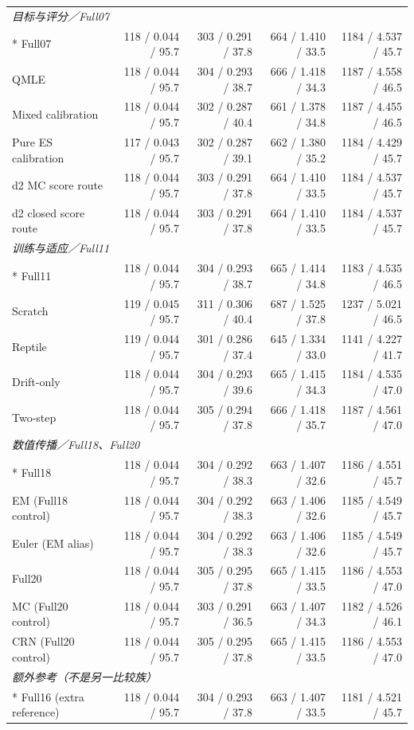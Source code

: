 \begin{longtable}{@{}p{.25\linewidth}rrrr@{}}
\midrule
\multicolumn{5}{l}{\textit{目标与评分／Full07}}\\*
Full07 & 118 / 0.044 / 95.7 & 303 / 0.291 / 37.8 & 664 / 1.410 / 33.5 & 1184 / 4.537 / 45.7\\
QMLE & 118 / 0.044 / 95.7 & 304 / 0.293 / 38.7 & 666 / 1.418 / 34.3 & 1187 / 4.558 / 46.5\\
Mixed calibration & 118 / 0.044 / 95.7 & 302 / 0.287 / 40.4 & 661 / 1.378 / 34.8 & 1187 / 4.455 / 46.5\\
Pure ES calibration & 117 / 0.043 / 95.7 & 302 / 0.287 / 39.1 & 662 / 1.380 / 35.2 & 1184 / 4.429 / 45.7\\
d2 MC score route & 118 / 0.044 / 95.7 & 303 / 0.291 / 37.8 & 664 / 1.410 / 33.5 & 1184 / 4.537 / 45.7\\
d2 closed score route & 118 / 0.044 / 95.7 & 303 / 0.291 / 37.8 & 664 / 1.410 / 33.5 & 1184 / 4.537 / 45.7\\
\midrule
\multicolumn{5}{l}{\textit{训练与适应／Full11}}\\*
Full11 & 118 / 0.044 / 95.7 & 304 / 0.293 / 38.7 & 665 / 1.414 / 34.8 & 1183 / 4.535 / 46.5\\
Scratch & 119 / 0.045 / 95.7 & 311 / 0.306 / 40.4 & 687 / 1.525 / 37.8 & 1237 / 5.021 / 46.5\\
Reptile & 119 / 0.044 / 95.7 & 301 / 0.286 / 37.4 & 645 / 1.334 / 33.0 & 1141 / 4.227 / 41.7\\
Drift-only & 118 / 0.044 / 95.7 & 304 / 0.293 / 39.6 & 665 / 1.415 / 34.3 & 1184 / 4.535 / 47.0\\
Two-step & 118 / 0.044 / 95.7 & 305 / 0.294 / 37.8 & 666 / 1.418 / 35.7 & 1187 / 4.561 / 47.0\\
\midrule
\multicolumn{5}{l}{\textit{数值传播／Full18、Full20}}\\*
Full18 & 118 / 0.044 / 95.7 & 304 / 0.292 / 38.3 & 663 / 1.407 / 32.6 & 1186 / 4.551 / 45.7\\
EM (Full18 control) & 118 / 0.044 / 95.7 & 304 / 0.292 / 38.3 & 663 / 1.406 / 32.6 & 1185 / 4.549 / 45.7\\
Euler (EM alias) & 118 / 0.044 / 95.7 & 304 / 0.292 / 38.3 & 663 / 1.406 / 32.6 & 1185 / 4.549 / 45.7\\
Full20 & 118 / 0.044 / 95.7 & 305 / 0.295 / 37.8 & 665 / 1.415 / 33.5 & 1186 / 4.553 / 47.0\\
MC (Full20 control) & 118 / 0.044 / 95.7 & 303 / 0.291 / 36.5 & 663 / 1.407 / 34.3 & 1182 / 4.526 / 46.1\\
CRN (Full20 control) & 118 / 0.044 / 95.7 & 305 / 0.295 / 37.8 & 665 / 1.415 / 33.5 & 1186 / 4.553 / 47.0\\
\midrule
\multicolumn{5}{l}{\textit{额外参考（不是另一比较族）}}\\*
Full16 (extra reference) & 118 / 0.044 / 95.7 & 304 / 0.293 / 37.8 & 663 / 1.407 / 33.5 & 1181 / 4.521 / 45.7\\
\end{longtable}
\endgroup
\Needspace{.65\textheight}
